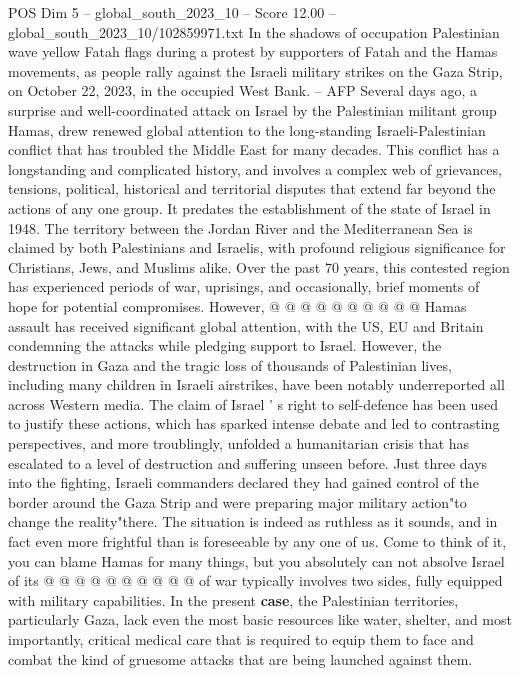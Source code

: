 \begin{textsample}{POS Dim 5 – global\_south\_2023\_10 – Score 12.00 – global\_south\_2023\_10/102859971.txt}  \label{ex:f5_pos_388}
In the shadows of occupation Palestinian wave yellow Fatah flags during a protest by supporters of Fatah and the Hamas movements, as people rally against the Israeli military strikes on the Gaza Strip, on October 22, 2023, in the occupied West Bank. -- AFP Several days ago, a surprise and well-coordinated attack on Israel by the Palestinian militant group Hamas, drew renewed global attention to the long-standing Israeli-Palestinian conflict that has troubled the Middle East for many decades.
This conflict has a longstanding and complicated history, and involves a complex web of grievances, tensions, political, historical and territorial disputes that extend far beyond the actions of any one group.
It predates the establishment of the state of Israel in 1948.
The territory between the Jordan River and the Mediterranean Sea is claimed by both Palestinians and Israelis, with profound religious significance for Christians, Jews, and Muslims alike.
Over the past 70 years, this contested region has experienced periods of war, uprisings, and occasionally, brief moments of hope for potential compromises.
However, @ @ @ @ @ @ @ @ @ @ Hamas assault has received significant global attention, with the US, EU and Britain condemning the attacks while pledging support to Israel.
However, the destruction in Gaza and the tragic loss of thousands of Palestinian lives, including many children in Israeli airstrikes, have been notably underreported all across Western media.
The claim of Israel ' s right to self-defence has been used to justify these actions, which has sparked intense debate and led to contrasting perspectives, and more troublingly, unfolded a humanitarian crisis that has escalated to a level of destruction and suffering unseen before.
Just three days into the fighting, Israeli commanders declared they had gained control of the border around the Gaza Strip and were preparing major military action"to change the reality"there.
The situation is indeed as ruthless as it sounds, and in fact even more frightful than is foreseeable by any one of us.
Come to think of it, you can blame Hamas for many things, but you absolutely can not absolve Israel of its @ @ @ @ @ @ @ @ @ @ of war typically involves two sides, fully equipped with military capabilities.
In the present \textbf{case}, the Palestinian territories, particularly Gaza, lack even the most basic resources like water, shelter, and most importantly, critical medical care that is required to equip them to face and combat the kind of gruesome attacks that are being launched against them.

\end{textsample}
